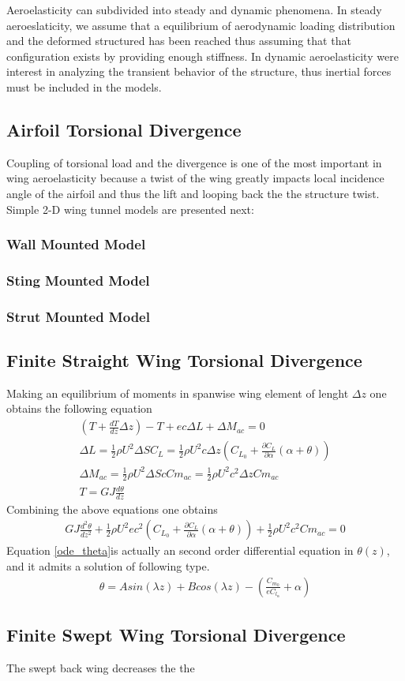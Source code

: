 Aeroelasticity can subdivided into steady and dynamic phenomena. In steady
aeroeslaticity, we assume that a equilibrium of aerodynamic loading distribution and the deformed structured has been reached thus assuming that that configuration exists by providing enough stiffness.  In dynamic aeroelasticity were interest in analyzing the transient behavior of the structure, thus inertial forces must be included in the models.

\subsection{Airfoil Torsional Divergence}
Coupling of torsional load and the divergence is one of the most important in wing aeroelasticity because a twist of the wing greatly impacts local incidence angle of the airfoil and thus the lift and looping back the the structure twist.
Simple 2-D wing tunnel models are presented next:

\subsubsection{Wall Mounted Model}

\subsubsection{Sting Mounted Model}

\subsubsection{Strut Mounted Model}

\subsection{Finite Straight Wing Torsional Divergence}
Making an equilibrium of moments in spanwise wing element of lenght $\Delta z$ one obtains the following equation
\begin{align}
\left( T+\frac{d T}{d z}\Delta z \right)-T +ec\Delta L + \Delta M_{ac}=0\\
\Delta L= \frac{1}{2} \rho U^2 \Delta S C_L = \frac{1}{2} \rho U^2 c \Delta z \left( C_{L_0} + \frac{\partial C_L}{\partial \alpha}(\alpha + \theta) \right)\\
\Delta M_{ac}= \frac{1}{2} \rho U^2 \Delta S c Cm_{ac} = \frac{1}{2} \rho U^2 c^2 \Delta z Cm_{ac}\\
T=GJ \frac{d \theta}{dz}
\end{align}
Combining the above equations one obtains
\begin{align}
GJ\frac{d^2 \theta}{dz^2} + \frac{1}{2} \rho U^2 ec^2 \left( C_{L_0} + \frac{\partial C_L}{\partial \alpha}(\alpha + \theta) \right) + \frac{1}{2} \rho U^2 c^2 Cm_{ac}=0 \label{ode_theta}
\end{align}
Equation \eqref{ode_theta}is actually an second order differential equation in $\theta(z)$, and it admits a solution of following type.
\begin{align}
\theta= A sin(\lambda z) + B cos(\lambda z) - \left(\frac{C_{m_0}}{e C_{l_\alpha}} + \alpha \right)
\end{align}




\subsection{Finite Swept Wing Torsional Divergence}
The swept back wing decreases the the

